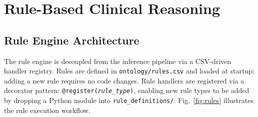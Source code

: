 \documentclass[journal]{IEEEtran}
\begin{document}
\section{Rule-Based Clinical Reasoning}
\label{sec:rules}

\subsection{Rule Engine Architecture}

The rule engine is decoupled from the inference pipeline via a
CSV-driven handler registry.
Rules are defined in \texttt{ontology/rules.csv} and loaded at
startup; adding a new rule requires no code changes.
Rule handlers are registered via a decorator pattern:
\texttt{@register(\textit{rule\_type})},
enabling new rule types to be added by dropping a Python module
into \texttt{rule\_definitions/}.
Fig.~\ref{fig:rules} illustrates the rule execution workflow.
\end{document}

